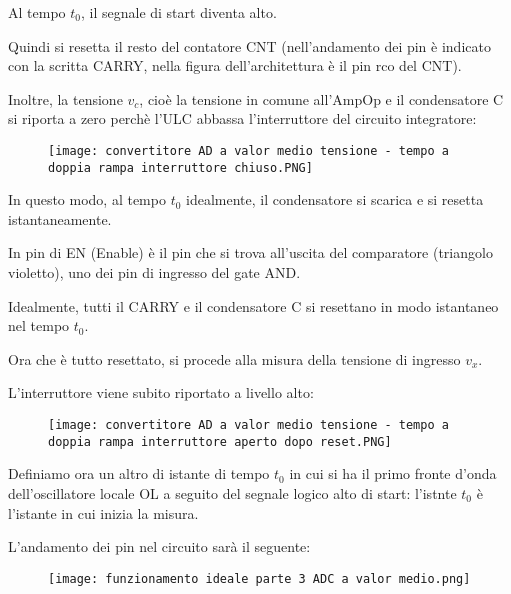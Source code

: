 Al tempo $t_0$, il segnale di start diventa alto. \newline 

Quindi si resetta il resto del contatore CNT (nell'andamento dei pin è indicato con la scritta CARRY, nella figura dell'architettura è il pin rco del CNT). \newline 

Inoltre, la tensione $v_c$, cioè la tensione in comune all'AmpOp e il condensatore C si riporta a zero perchè l'ULC abbassa l'interruttore del circuito integratore: 

\begin{figure}[h]
    \centering
    \texttt{[image: convertitore AD a valor medio tensione - tempo a doppia rampa interruttore chiuso.PNG]}
\end{figure}

In questo modo, al tempo $t_0$ idealmente, il condensatore si scarica e si resetta istantaneamente. \newline 

In pin di EN (Enable) è il pin che si trova all'uscita del comparatore (triangolo violetto), 
uno dei pin di ingresso del gate AND. \newline 

Idealmente, tutti il CARRY e il condensatore C si resettano in modo istantaneo nel tempo $t_0$. \newline 

Ora che è tutto resettato, si procede alla misura della tensione di ingresso $v_x$. \newline 

\newpage 

L'interruttore viene subito riportato a livello alto: 

\begin{figure}[h]
    \centering
    \texttt{[image: convertitore AD a valor medio tensione - tempo a doppia rampa interruttore aperto dopo reset.PNG]}
\end{figure}

Definiamo ora un altro di istante di tempo $t_0$ in cui si ha il primo fronte d'onda dell'oscillatore locale OL a seguito del segnale logico alto di start: 
l'istnte $t_0$ è l'istante in cui inizia la misura. \newline 

L'andamento dei pin nel circuito sarà  il seguente: 

\begin{figure}[h]
    \centering
    \texttt{[image: funzionamento ideale parte 3 ADC a valor medio.png]}
\end{figure}

